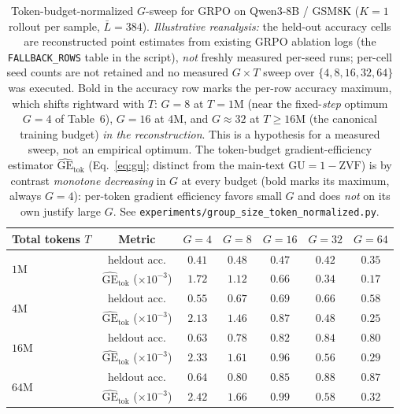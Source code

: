\documentclass{article}
\begin{document}
\begin{table}[ht]
\centering
\small
\begin{tabular}{lcccccc}
\toprule
Total tokens $T$ & Metric &
$G{=}4$ & $G{=}8$ & $G{=}16$ & $G{=}32$ & $G{=}64$ \\
\midrule
\multirow{2}{*}{$1\text{M}$}  & heldout acc. & $0.41$ & $\mathbf{0.48}$ & $0.47$ & $0.42$ & $0.35$ \\
                               & $\widehat{\mathrm{GE}}_{\text{tok}}$ ($\times 10^{-3}$) & $\mathbf{1.72}$ & $1.12$ & $0.66$ & $0.34$ & $0.17$ \\
\multirow{2}{*}{$4\text{M}$}  & heldout acc. & $0.55$ & $0.67$ & $\mathbf{0.69}$ & $0.66$ & $0.58$ \\
                               & $\widehat{\mathrm{GE}}_{\text{tok}}$ ($\times 10^{-3}$) & $\mathbf{2.13}$ & $1.46$ & $0.87$ & $0.48$ & $0.25$ \\
\multirow{2}{*}{$16\text{M}$} & heldout acc. & $0.63$ & $0.78$ & $0.82$ & $\mathbf{0.84}$ & $0.80$ \\
                               & $\widehat{\mathrm{GE}}_{\text{tok}}$ ($\times 10^{-3}$) & $\mathbf{2.33}$ & $1.61$ & $0.96$ & $0.56$ & $0.29$ \\
\multirow{2}{*}{$64\text{M}$} & heldout acc. & $0.64$ & $0.80$ & $0.85$ & $\mathbf{0.88}$ & $0.87$ \\
                               & $\widehat{\mathrm{GE}}_{\text{tok}}$ ($\times 10^{-3}$) & $\mathbf{2.42}$ & $1.66$ & $0.99$ & $0.58$ & $0.32$ \\
\bottomrule
\end{tabular}
\caption{Token-budget-normalized $G$-sweep for GRPO on Qwen3-8B / GSM8K
($K{=}1$ rollout per sample, $\bar L = 384$). \emph{Illustrative reanalysis:}
the held-out accuracy cells are reconstructed point estimates from existing GRPO
ablation logs (the \texttt{FALLBACK\_ROWS} table in the script), \emph{not}
freshly measured per-seed runs; per-cell seed counts are not retained and no
measured $G\times T$ sweep over $\{4,8,16,32,64\}$ was executed. Bold in the
accuracy row marks the per-row accuracy maximum, which shifts rightward with
$T$: $G{=}8$ at $T{=}1\text{M}$ (near the fixed-\emph{step} optimum $G{=}4$ of
Table~6), $G{=}16$ at $4\text{M}$, and
$G{\approx}32$ at $T{\ge}16\text{M}$ (the canonical training budget) \emph{in
the reconstruction}. This is a hypothesis for a measured sweep, not an
empirical optimum. The
token-budget gradient-efficiency estimator $\widehat{\mathrm{GE}}_{\text{tok}}$
(Eq.~\ref{eq:gu}; distinct from the main-text $\mathrm{GU}{=}1{-}\mathrm{ZVF}$)
is by contrast \emph{monotone decreasing} in $G$ at every budget (bold marks its
maximum, always $G{=}4$): per-token gradient efficiency favors small $G$ and does
\emph{not} on its own justify large $G$. See
\texttt{experiments/group\_size\_token\_normalized.py}.}
\label{tab:groupsize-tokennorm}
\end{table}
\end{document}
